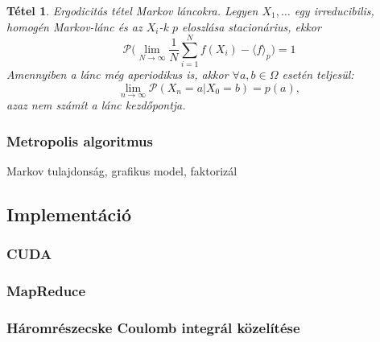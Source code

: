 \documentclass[10pt,a4paper]{article}
\numberwithin{equation}{subsection}
\numberwithin{figure}{section}
\newtheorem{theorem}{Tétel}[section]
\begin{document}
\begin{theorem}{Ergodicitás tétel Markov láncokra.}
Legyen $X_1,\dots$ egy irreducibilis, homogén Markov-lánc és az $X_i$-k $p$ eloszlása stacionárius, ekkor
\begin{equation}
\mathcal{P}\Bigg(\lim_{N\rightarrow\infty}\frac{1}{N}\sum_{i=1}^Nf(X_i)-\langle f \rangle_p\Bigg)=1
\end{equation}
Amennyiben a lánc még aperiodikus is, akkor $\forall a,b\in\Omega$ esetén teljesül: 
\begin{equation}
\lim_{n\rightarrow\infty}\mathcal{P}(X_n=a|X_0=b) = p(a),
\end{equation}
azaz nem számít a lánc kezdőpontja.
\end{theorem}


\subsubsection{Metropolis algoritmus}
Markov tulajdonság, grafikus model, faktorizál

\subsection{Implementáció}
\subsubsection{CUDA}\label{sec:CUDA}
\subsubsection{MapReduce}\label{sec:MapReduce}
\subsubsection{Háromrészecske Coulomb integrál közelítése}
\end{document}
